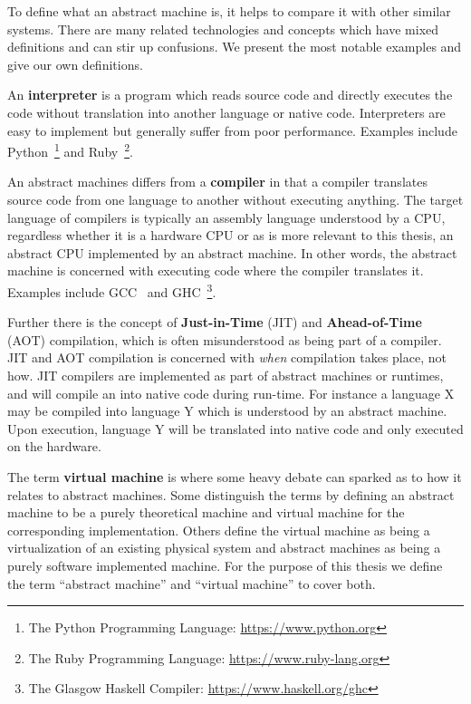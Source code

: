 To define what an abstract machine is, it helps to compare it with other similar
systems. There are many related technologies and concepts which have mixed
definitions and can stir up confusions. We present the most notable examples and
give our own definitions.

An \textbf{interpreter} is a program which reads source code and directly
executes the code without translation into another language or native
code. Interpreters are easy to implement but generally suffer from poor
performance\cite{NEEDED}. Examples include Python~\footnote{The Python
  Programming Language: \url{https://www.python.org}} and Ruby~\footnote{The
  Ruby Programming Language: \url{https://www.ruby-lang.org}}.

An abstract machines differs from a \textbf{compiler} in that a compiler
translates source code from one language to another without executing
anything. The target language of compilers is typically an assembly language
understood by a CPU, regardless whether it is a hardware CPU or as is more
relevant to this thesis, an abstract CPU implemented by an abstract machine. In
other words, the abstract machine is concerned with executing code where the
compiler translates it. Examples include GCC~\cite{gnu:gcc} and
GHC~\footnote{The Glasgow Haskell Compiler: \url{https://www.haskell.org/ghc}}.

Further there is the concept of \textbf{Just-in-Time} (JIT) and
\textbf{Ahead-of-Time} (AOT) compilation, which is often misunderstood as being
part of a compiler. JIT and AOT compilation is concerned with \textit{when}
compilation takes place, not how. JIT compilers are implemented as part of
abstract machines or runtimes, and will compile an  into native code during run-time. For instance a language X
may be compiled into language Y which is understood by an abstract machine. Upon
execution, language Y will be translated into native code and only executed on
the hardware.

The term \textbf{virtual machine} is where some heavy debate can sparked as to
how it relates to abstract machines. Some distinguish the terms by defining an
abstract machine to be a purely theoretical machine and virtual machine for the
corresponding implementation. Others define the virtual machine as being a
virtualization of an existing physical system and abstract machines as being a
purely software implemented machine. For the purpose of this thesis we define
the term ``abstract machine'' and ``virtual machine'' to cover both.

